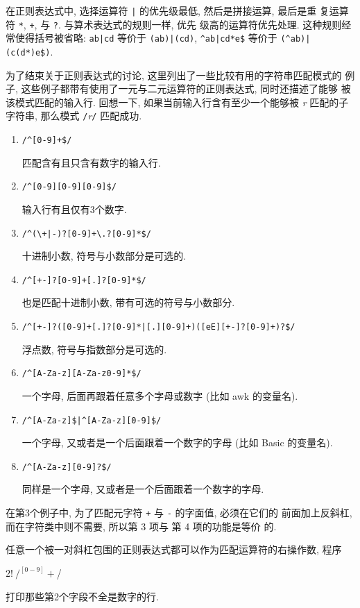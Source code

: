 在正则表达式中, 选择运算符 \verb'|' 的优先级最低, 然后是拼接运算, 最后是重
复运算符 \verb'*', \verb'+', 与 \verb'?'. 与算术表达式的规则一样, 优先
级高的运算符优先处理. 这种规则经常使得括号被省略: \verb'ab|cd' 等价于
\verb'(ab)|(cd)', \verb'^ab|cd*e$' 等价于 \verb'(^ab)|(c(d*)e$)'.

为了结束关于正则表达式的讨论, 这里列出了一些比较有用的字符串匹配模式的
例子, 这些例子都带有使用了一元与二元运算符的正则表达式, 同时还描述了能够
被该模式匹配的输入行. 回想一下, 如果当前输入行含有至少一个能够被
\textit{r} 匹配的子字符串, 那么模式 \verb'/'\textit{r}\verb'/'
匹配成功.
\begin{enumerate}
\item[] \verb'/^[0-9]+$/' \par
    \qquad 匹配含有且只含有数字的输入行.
\item[] \verb'/^[0-9][0-9][0-9]$/' \par
    \qquad 输入行有且仅有3个数字.
\item[] \verb'/^(\+|-)?[0-9]+\.?[0-9]*$/' \par
    \qquad 十进制小数, 符号与小数部分是可选的.
\item[] \verb'/^[+-]?[0-9]+[.]?[0-9]*$/' \par
    \qquad 也是匹配十进制小数, 带有可选的符号与小数部分.
\item[] \verb'/^[+-]?([0-9]+[.]?[0-9]*|[.][0-9]+)([eE][+-]?[0-9]+)?$/' \par
    \qquad 浮点数, 符号与指数部分是可选的.
\item[] \verb'/^[A-Za-z][A-Za-z0-9]*$/' \par
    \qquad 一个字母, 后面再跟着任意多个字母或数字 (比如 awk 的变量名).
\item[] \verb'/^[A-Za-z]$|^[A-Za-z][0-9]$/' \par
    \qquad 一个字母, 又或者是一个后面跟着一个数字的字母 (比如 Basic 的变量名).
\item[] \verb'/^[A-Za-z][0-9]?$/' \par
    \qquad 同样是一个字母, 又或者是一个后面跟着一个数字的字母.
\end{enumerate}
在第3个例子中, 为了匹配元字符 \verb'+' 与 \verb'-' 的字面值, 必须在它们的
前面加上反斜杠, 而在字符类中则不需要, 所以第 3 项与 第 4 项的功能是等价
的.

任意一个被一对斜杠包围的正则表达式都可以作为匹配运算符的右操作数, 程序
\begin{awkcode}
    $2 !~ /^[0-9]+$/
\end{awkcode}
打印那些第2个字段不全是数字的行.

